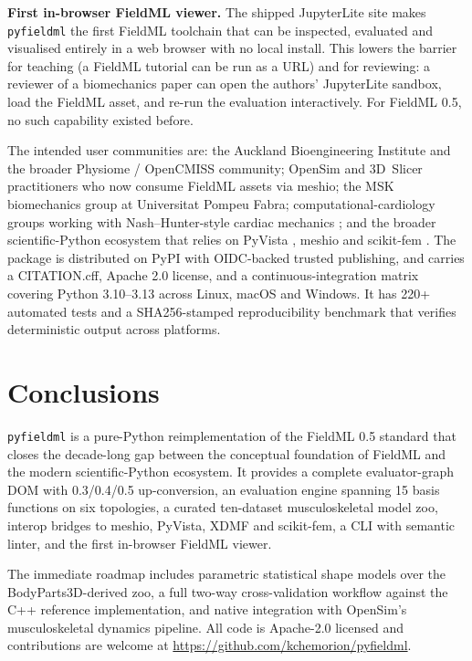 \documentclass[preprint,12pt,a4paper]{elsarticle}
\begin{document}
\textbf{First in-browser FieldML viewer.} The shipped JupyterLite \cite{jupyterlite} site makes \texttt{pyfieldml} the first FieldML toolchain that can be inspected, evaluated and visualised entirely in a web browser with no local install. This lowers the barrier for teaching (a FieldML tutorial can be run as a URL) and for reviewing: a reviewer of a biomechanics paper can open the authors' JupyterLite sandbox, load the FieldML asset, and re-run the evaluation interactively. For FieldML 0.5, no such capability existed before.

The intended user communities are: the Auckland Bioengineering Institute and the broader Physiome / OpenCMISS community; OpenSim \cite{seth_opensim_2018} and 3D~Slicer \cite{fedorov_3dslicer_2012} practitioners who now consume FieldML assets via meshio; the MSK biomechanics group at Universitat Pompeu Fabra; computational-cardiology groups working with Nash--Hunter-style cardiac mechanics \cite{nash_hunter_2001}; and the broader scientific-Python ecosystem that relies on PyVista \cite{pyvista}, meshio \cite{meshio} and scikit-fem \cite{scikit_fem}. The package is distributed on PyPI with OIDC-backed trusted publishing, and carries a CITATION.cff, Apache 2.0 license, and a continuous-integration matrix covering Python 3.10--3.13 across Linux, macOS and Windows. It has 220+ automated tests and a SHA256-stamped reproducibility benchmark that verifies deterministic output across platforms.

\section{Conclusions}

\texttt{pyfieldml} is a pure-Python reimplementation of the FieldML 0.5 standard that closes the decade-long gap between the conceptual foundation of FieldML \cite{fieldml_christie_2009} and the modern scientific-Python ecosystem. It provides a complete evaluator-graph DOM with 0.3/0.4/0.5 up-conversion, an evaluation engine spanning 15 basis functions on six topologies, a curated ten-dataset musculoskeletal model zoo, interop bridges to meshio, PyVista, XDMF and scikit-fem, a CLI with semantic linter, and the first in-browser FieldML viewer.

The immediate roadmap includes parametric statistical shape models \cite{cootes_ssm_1995} over the BodyParts3D-derived zoo, a full two-way cross-validation workflow against the C++ reference implementation, and native integration with OpenSim's musculoskeletal dynamics pipeline. All code is Apache-2.0 licensed and contributions are welcome at \url{https://github.com/kchemorion/pyfieldml}.
\end{document}

